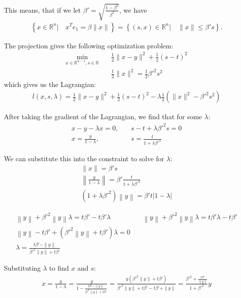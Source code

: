 \documentclass{article}
\theoremstyle{case}
\numberwithin{theorem}{subsection}
\begin{document}
This means, that if we let $\beta' = \sqrt{\frac{1 - \beta^2}{\beta^2}}$, we have
\begin{align*}
\left\{ x \in \mathbb R^n | \quad x^Te_1 = \beta \|x\| \right\} = \left \{(s, x)\in \mathbb R^n | \quad\|x\| \le \beta' s \right\}.
\end{align*}

The projection gives the following optimization problem:
\begin{align*}
\min_{x \in \mathbb R^{n-1}, s \in \mathbb R} & \quad \frac 1 2 \|x - y\|^2 + \frac 1 2 (s - t)^2 \\
			& \quad \frac 1 2 \|x\|^2 = \frac 1 2 {\beta'}^2 s^2
\end{align*}
which gives us the Lagrangian:
\begin{align*}
l(x, s, \lambda) = \frac 1 2 \|x - y \|^2 + \frac 1 2 \left(s - t\right)^2 - \lambda \frac 1 2 \left(\|x\|^2 - {\beta'}^2 s^2\right)
\end{align*}

After taking the gradient of the Lagrangian, we find that for some $\lambda$:
\begin{align*}
x - y - \lambda x = 0, & \quad s - t + \lambda {\beta'}^2 s = 0 \\
x = \frac {y}{1 - \lambda}, & \quad s = \frac {t}{1 + \lambda {\beta'}^2 }
\end{align*}

We can substitute this into the constraint to solve for $\lambda$:
\begin{align*}
\|x\| = {\beta'} s \\
\left\|\frac {y}{1 - \lambda}\right\| = {\beta'} \frac {t}{1 + \lambda {\beta'}^2 } \\
\left(1 + \lambda {\beta'}^2\right) \left\|y\right\| = {\beta'}  {t} \left|1 - \lambda\right|
\end{align*}

\begin{align*}
\left\|y\right\| + {\beta'}^2\left\|y\right\|\lambda = t {\beta'} - t {\beta'} \lambda          &   \quad
\left\|y\right\| + {\beta'}^2\left\|y\right\|\lambda = t {\beta'} \lambda - t {\beta'}					\\
\left\|y\right\|-t {\beta'} +\left( {\beta'}^2\left\|y\right\| + t {\beta'} \right)\lambda = 0  &		\\
\lambda = \frac{t {\beta'} - \|y\|}{{\beta'}^2\|y\| + t {\beta'}}                               &		
\end{align*}


Substituting $\lambda$ to find $x$ and $s$:
\begin{align*}
x = \frac {y}{1 - \lambda} 																		
= \frac {y}{1 - \frac{t{\beta'} - \|y\|}{{\beta'}^2\|y\| + t{\beta'}}} 									
= \frac {y\left({\beta'}^2\|y\| + t{\beta'}\right)}{{\beta'}^2\|y\| + t{\beta'} - t{\beta'} + \|y\|} 			
= \frac {{\beta'}^2 + \frac{t{\beta'}}{\|y\|}}{1 + {\beta'}^2}y 											
\end{align*}
\end{document}
